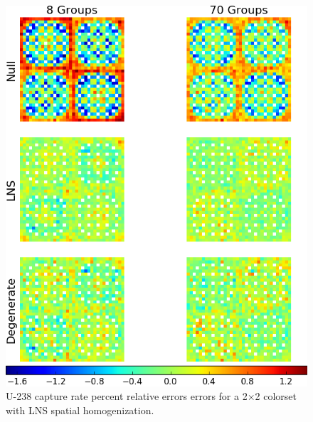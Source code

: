 \begin{figure}[h!]
\centering
\includegraphics[width=\linewidth]{figures/patterns/lns/2x2/capt-err}
\vspace{2mm}
\caption[U-238 capture rate errors for a 2$\times$2 colorset]{U-238 capture rate percent relative errors errors for a 2$\times$2 colorset with \ac{LNS} spatial homogenization.}
\label{fig:chap9-2x2-lns-capt-err}
\end{figure}

\clearpage

